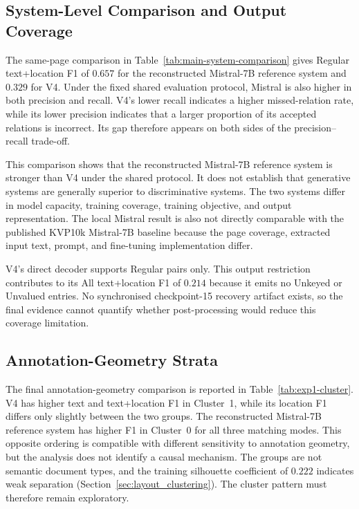 \subsection{System-Level Comparison and Output Coverage}

The same-page comparison in Table~\ref{tab:main-system-comparison} gives
Regular text+location F1 of $0.657$ for the reconstructed Mistral-7B reference
system and $0.329$ for V4. Under the fixed shared evaluation protocol, Mistral
is also higher in both precision and recall. V4's lower recall indicates a
higher missed-relation rate, while its lower precision indicates that a larger
proportion of its accepted relations is incorrect. Its gap therefore appears
on both sides of the precision--recall trade-off.

This comparison shows that the reconstructed Mistral-7B reference system is
stronger than V4 under the shared protocol. It does not establish that
generative systems are generally superior to discriminative systems. The two
systems differ in model capacity, training coverage, training objective, and
output representation.
The local Mistral result is also not directly comparable with the published
KVP10k Mistral-7B baseline because the page coverage, extracted input text,
prompt, and fine-tuning implementation differ.

V4's direct decoder supports Regular pairs only. This output restriction
contributes to its All text+location F1 of $0.214$ because it emits no Unkeyed
or Unvalued entries. No synchronised checkpoint-15 recovery artifact exists,
so the final evidence cannot quantify whether post-processing would reduce
this coverage limitation.

\subsection{Annotation-Geometry Strata}

The final annotation-geometry comparison is reported in
Table~\ref{tab:exp1-cluster}. V4 has higher text and text+location F1 in
Cluster~1, while its location F1 differs only slightly between the two groups.
The reconstructed Mistral-7B reference system has higher F1 in Cluster~0 for
all three matching modes. This opposite ordering is compatible with different
sensitivity to annotation geometry, but the analysis does not identify a
causal mechanism. The groups are not semantic document types, and the training
silhouette coefficient of $0.222$ indicates weak separation
(Section~\ref{sec:layout_clustering}). The cluster pattern must therefore
remain exploratory.

